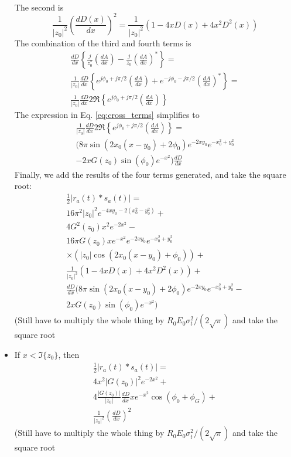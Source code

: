 \documentclass[amsmath,amssymb,aps,prd,10pt,twocolumn,showkeys]{revtex4}
\begin{document}
\begin{itemize}
\begin{multline}
\end{multline}
The second is
\begin{equation}
\frac{1}{|z_0|^2}\left(\frac{dD(x)}{dx}\right)^2 = \frac{1}{|z_0|^2}\left(1-4xD(x)+4x^2D^2(x) \right)
\end{equation}
The combination of the third and fourth terms is
\begin{multline}
\frac{dD}{dx}\left\lbrace \frac{j}{z_0^{*}} \left(\frac{dA}{dx}\right) - \frac{j}{z_0} \left(\frac{dA}{dx}\right)^{*}\right\rbrace = \\
\frac{1}{|z_0|}\frac{dD}{dx}\left\lbrace e^{j\phi_0+j\pi/2} \left(\frac{dA}{dx}\right) + e^{-j\phi_0-j\pi/2} \left(\frac{dA}{dx}\right)^{*}\right\rbrace = \\ 
\frac{1}{|z_0|}\frac{dD}{dx}2\Re\left\lbrace e^{j\phi_0+j\pi/2} \left(\frac{dA}{dx}\right) \right\rbrace \label{eq:cross_terms}
\end{multline}
The expression in Eq. \ref{eq:cross_terms} simplifies to
\begin{multline}
\frac{1}{|z_0|}\frac{dD}{dx}2\Re\left\lbrace e^{j\phi_0+j\pi/2} \left(\frac{dA}{dx}\right) \right\rbrace = \\
(8\pi\sin(2x_0(x-y_0)+2\phi_0)e^{-2xy_0}e^{-x_0^2+y_0^2} \\ -2xG(z_0)\sin(\phi_0) e^{-x^2})\frac{dD}{dx}
\end{multline}
Finally, we add the results of the four terms generated, and take the square root:
\begin{multline}
\frac{1}{2}| r_a (t) * s_a(t)| = \\
16\pi^2|z_0|^2 e^{-4x y_0 - 2(x_0^2-y_0^2)} + \\ 4G^2(z_0)x^2 e^{-2x^2} - \\ 16\pi G(z_0) x e^{-x^2}e^{-2xy_0} e^{-x_0^2+y_0^2} \\ \times \left(|z_0|\cos(2x_0(x-y_0)+\phi_0) \right) + \\
\frac{1}{|z_0|^2}\left(1-4xD(x)+4x^2D^2(x) \right) + \\
\frac{dD}{dx}(8\pi\sin(2x_0(x-y_0)+2\phi_0)e^{-2xy_0}e^{-x_0^2+y_0^2} - \\ 2xG(z_0)\sin(\phi_0) e^{-x^2})
\end{multline}
(Still have to multiply the whole thing by $R_0 E_0 \sigma_t^2/(2\sqrt{\pi})$ and take the square root
\item If $x < \Im\lbrace z_0\rbrace$, then 
\begin{multline}
\frac{1}{2}| r_a (t) * s_a(t)| = \\
4x^2|G(z_0)|^2 e^{-2x^2} + \\
4\frac{|G(z_0)|}{|z_0|}\frac{dD}{dx}x e^{-x^2} \cos(\phi_0 + \phi_G) + \\
\frac{1}{|z_0|^2} \left(\frac{dD}{dx}\right)^2
\end{multline}
(Still have to multiply the whole thing by $R_0 E_0 \sigma_t^2/(2\sqrt{\pi})$ and take the square root
\end{itemize}
\end{document}
